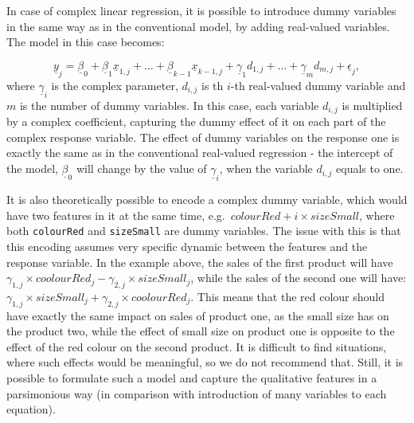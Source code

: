 \documentclass[
]{book}
\begin{document}
In case of complex linear regression, it is possible to introduce dummy variables in the same way as in the conventional model, by adding real-valued variables. The model in this case becomes:

\begin{equation}
    \underline{y}_j = \underline{\beta}_0 + \underline{\beta}_1 \underline{x}_{1,j} + \dots + \underline{\beta}_{k-1} \underline{x}_{k-1,j} + \underline{\gamma}_1 d_{1,j} + \dots + \underline{\gamma}_m d_{m,j} + \underline{\epsilon}_j,
    \label{eq:MultipleCLRComplexDummy}
\end{equation}
where \(\underline{\gamma}_i\) is the complex parameter, \(d_{i,j}\) is th \(i\)-th real-valued dummy variable and \(m\) is the number of dummy variables. In this case, each variable \(d_{i,j}\) is multiplied by a complex coefficient, capturing the dummy effect of it on each part of the complex response variable. The effect of dummy variables on the response one is exactly the same as in the conventional real-valued regression - the intercept of the model, \(\underline{\beta}_0\) will change by the value of \(\underline{\gamma}_i\), when the variable \(d_{i,j}\) equals to one.

It is also theoretically possible to encode a complex dummy variable, which would have two features in it at the same time, e.g.~\(colourRed + i \times sizeSmall\), where both \texttt{colourRed} and \texttt{sizeSmall} are dummy variables. The issue with this is that this encoding assumes very specific dynamic between the features and the response variable. In the example above, the sales of the first product will have \(\gamma_{1,j} \times coolourRed_j - \gamma_{2,j} \times sizeSmall_j\), while the sales of the second one will have: \(\gamma_{1,j} \times sizeSmall_j + \gamma_{2,j} \times coolourRed_j\). This means that the red colour should have exactly the same impact on sales of product one, as the small size has on the product two, while the effect of small size on product one is opposite to the effect of the red colour on the second product. It is difficult to find situations, where such effects would be meaningful, so we do not recommend that. Still, it is possible to formulate such a model and capture the qualitative features in a parsimonious way (in comparison with introduction of many variables to each equation).
\end{document}
